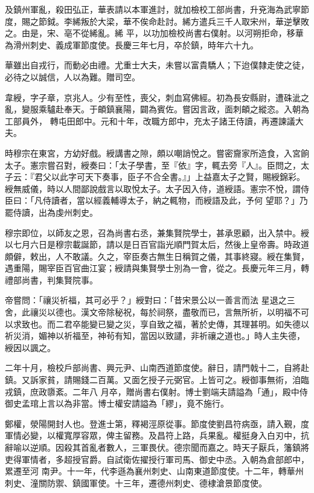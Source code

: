 \begin{pinyinscope}
 及鎮州軍亂，殺田弘正，華表請以本軍進討，就加檢校工部尚書，升兗海為武寧節度，賜之節鉞。李絺叛於大梁，華不俟命赴討。絺方遣兵三千人取宋州，華逆擊敗之。由是，宋、亳不從絺亂。絺
 平，以功加檢校尚書右僕射。以河朔拒命，移華為滑州刺史、義成軍節度使。長慶三年七月，卒於鎮，時年六十九。



 華雖出自戎行，而動必由禮。尤重士大夫，未嘗以富貴驕人；下迨僕隸走使之徒，必待之以誠信，人以為難。贈司空。



 韋綬，字子章，京兆人。少有至性，喪父，刺血寫佛經。初為長安縣尉，遭硃泚之亂，變服乘驢赴奉天。于頔鎮襄陽，闢為賓佐。嘗因言政，面刺頔之縱恣。入朝為工部員外，
 轉屯田郎中。元和十年，改職方郎中，充太子諸王侍讀，再遷諫議大夫。



 時穆宗在東宮，方幼好戲。綬講書之隙，頗以嘲誚悅之。嘗密齎家所造食，入宮餉太子。憲宗嘗召對，綬奏曰：「太子學書，至『依』字，輒去旁『人』。臣問之，太子云：『君父以此字可天下奏事，臣子不合全書。』」上益嘉太子之賢，賜綬錦彩。綬無威儀，時以人間鄙說戲言以取悅太子。太子因入侍，道綬語。憲宗不悅，謂侍臣曰：「凡侍讀者，當以經義輔導太子，納之輒物，而綬語及此，予何
 望耶？」乃罷侍讀，出為虔州刺史。



 穆宗即位，以師友之恩，召為尚書右丞，兼集賢院學士，甚承恩顧，出入禁中。綬以七月六日是穆宗載誕節，請以是日百官詣光順門賀太后，然後上皇帝壽。時政道頗僻，敕出，人不敢議。久之，宰臣奏古無生日稱賀之儀，其事終寢。綬在集賢，遇重陽，賜宰臣百官曲江宴；綬請與集賢學士別為一會，從之。長慶元年三月，轉禮部尚書，判集賢院事。



 帝嘗問：「禳災祈福，其可必乎？」綬對曰：「昔宋景公以一善言而法
 星退之三舍，此禳災以德也。漢文帝除秘祝，每於祠祭，盡敬而已，言無所祈，以明福不可以求致也。而二君卒能變已變之災，享自致之福，著於史傳，其理甚明。如失德以祈災消，媚神以祈福至，神茍有知，當因以致譴，非祈禳之道也。」時人主失德，綬因以諷之。



 二年十月，檢校戶部尚書、興元尹、山南西道節度使。辭日，請門戟十二，自將赴鎮。又訴家貧，請賜錢二百萬。又面乞授子元弼官。上皆可之。綬御事無術，洎臨戎鎮，庶政隳紊。二年八
 月卒，贈尚書右僕射。博士劉端夫請謚為「通」，殿中侍御史孟琯上言以為非當。博士權安請謚為「繆」，竟不施行。



 鄭權，滎陽開封人也。登進士第，釋褐涇原從事。節度使劉昌符病亟，請入覲，度軍情必變，以權寬厚容眾，俾主留務。及昌符上路，兵果亂。權挺身入白刃中，抗辭喻以逆順。因殺其首亂者數人，三軍畏伏。德宗聞而嘉之。時天子厭兵，籓鎮將吏得軍情者，多超授官爵。自試衛佐擢授行軍司馬、御史中丞。入朝為倉部郎中，累遷至河
 南尹。十一年，代李遜為襄州刺史、山南東道節度使。十二年，轉華州刺史、潼關防禦、鎮國軍使。十三年，遷德州刺史、德棣滄景節度使。




\end{pinyinscope}
